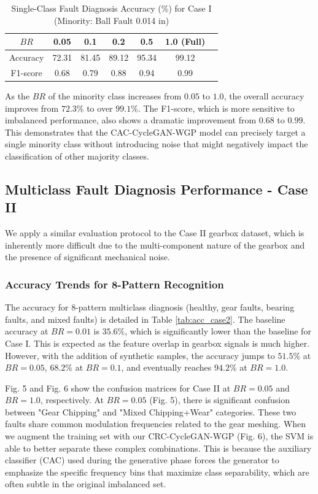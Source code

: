 \begin{table}[htbp]
\centering
\caption{Single-Class Fault Diagnosis Accuracy (\%) for Case I (Minority: Ball Fault 0.014 in)}
\label{tab:single_case1}
\begin{tabular}{ccccccc}
\hline
$BR$ & 0.05 & 0.1 & 0.2 & 0.5 & 1.0 (Full) \\ \hline
Accuracy & 72.31 & 81.45 & 89.12 & 95.34 & 99.12 \\
F1-score & 0.68  & 0.79  & 0.88  & 0.94  & 0.99 \\
\hline
\end{tabular}
\end{table}

As the $BR$ of the minority class increases from $0.05$ to $1.0$, the overall accuracy improves from $72.3\%$ to over $99.1\%$. The F1-score, which is more sensitive to imbalanced performance, also shows a dramatic improvement from $0.68$ to $0.99$. This demonstrates that the CAC-CycleGAN-WGP model can precisely target a single minority class without introducing noise that might negatively impact the classification of other majority classes.

\subsection{Multiclass Fault Diagnosis Performance - Case II}
We apply a similar evaluation protocol to the Case II gearbox dataset, which is inherently more difficult due to the multi-component nature of the gearbox and the presence of significant mechanical noise.

\subsubsection{Accuracy Trends for 8-Pattern Recognition}
The accuracy for 8-pattern multiclass diagnosis (healthy, gear faults, bearing faults, and mixed faults) is detailed in Table \ref{tab:acc_case2}. The baseline accuracy at $BR=0.01$ is $35.6\%$, which is significantly lower than the baseline for Case I. This is expected as the feature overlap in gearbox signals is much higher. However, with the addition of synthetic samples, the accuracy jumps to $51.5\%$ at $BR=0.05$, $68.2\%$ at $BR=0.1$, and eventually reaches $94.2\%$ at $BR=1.0$.

Fig. 5 and Fig. 6 show the confusion matrices for Case II at $BR=0.05$ and $BR=1.0$, respectively. At $BR=0.05$ (Fig. 5), there is significant confusion between "Gear Chipping" and "Mixed Chipping+Wear" categories. These two faults share common modulation frequencies related to the gear meshing. When we augment the training set with our CRC-CycleGAN-WGP (Fig. 6), the SVM is able to better separate these complex combinations. This is because the auxiliary classifier (CAC) used during the generative phase forces the generator to emphasize the specific frequency bins that maximize class separability, which are often subtle in the original imbalanced set.

